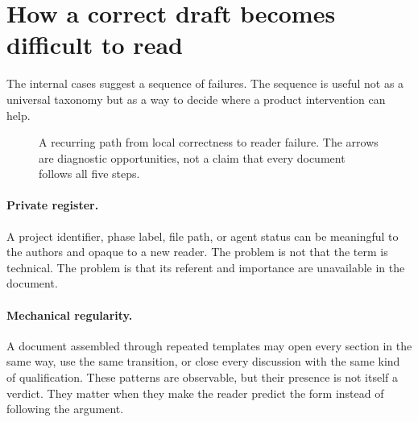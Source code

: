 \hvFigureReaderBurden

\section{How a correct draft becomes difficult to read}

The internal cases suggest a sequence of failures. The sequence is useful not
as a universal taxonomy but as a way to decide where a product intervention can
help.

\begin{figure}[H]
\centering
{}%
\caption{A recurring path from local correctness to reader failure. The arrows
are diagnostic opportunities, not a claim that every document follows all five
steps.}
\label{fig:failure-layers}
\end{figure}

\paragraph{Private register.} A project identifier, phase label, file path, or
agent status can be meaningful to the authors and opaque to a new reader. The
problem is not that the term is technical. The problem is that its referent and
importance are unavailable in the document.

\paragraph{Mechanical regularity.} A document assembled through repeated
templates may open every section in the same way, use the same transition, or
close every discussion with the same kind of qualification. These patterns are
observable, but their presence is not itself a verdict. They matter when they
make the reader predict the form instead of following the argument.

